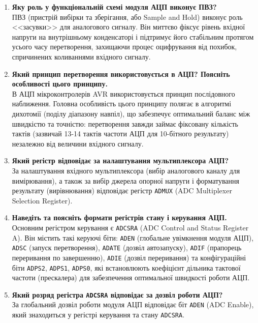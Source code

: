 \documentclass[14pt, a4paper]{extreport}
\begin{document}
\begin{enumerate}
		\item \textbf{Яку роль у функціональній схемі модуля АЦП виконує ПВЗ?} \\ ПВЗ (пристрій вибірки та зберігання, або Sample and Hold) виконує роль <<засувки>> для аналогового сигналу. Він миттєво фіксує рівень вхідної напруги на внутрішньому конденсаторі і підтримує його стабільним протягом усього часу перетворення, захищаючи процес оцифрування від похибок, спричинених коливаннями вхідного сигналу.
		
		\item \textbf{Який принцип перетворення використовується в АЦП? Поясніть особливості цього принципу.} \\ В АЦП мікроконтролерів AVR використовується принцип послідовного наближення. Головна особливість цього принципу полягає в алгоритмі дихотомії (поділу діапазону навпіл), що забезпечує оптимальний баланс між швидкістю та точністю: перетворення завжди займає фіксовану кількість тактів (зазвичай 13-14 тактів частоти АЦП для 10-бітного результату) незалежно від величини вхідного сигналу.
		
		\item \textbf{Який регістр відповідає за налаштування мультиплексора АЦП?} \\ За налаштування вхідного мультиплексора (вибір аналогового каналу для вимірювання), а також за вибір джерела опорної напруги і форматування результату (вирівнювання) відповідає регістр \texttt{ADMUX} (ADC Multiplexer Selection Register).
		
		\item \textbf{Наведіть та поясніть формати регістрів стану і керування АЦП.} \\ Основним регістром керування є \texttt{ADCSRA} (ADC Control and Status Register A). Він містить такі керуючі біти: \texttt{ADEN} (глобальне увімкнення модуля АЦП), \texttt{ADSC} (запуск перетворення), \texttt{ADATE} (дозвіл автозапуску), \texttt{ADIF} (прапорець переривання по завершенню), \texttt{ADIE} (дозвіл переривання) та конфігураційні біти \texttt{ADPS2}, \texttt{ADPS1}, \texttt{ADPS0}, які встановлюють коефіцієнт дільника тактової частоти (прескалера) для забезпечення оптимальної швидкості роботи АЦП.
		
		\item \textbf{Який розряд регістра \texttt{ADCSRA} відповідає за дозвіл роботи АЦП?} \\ За глобальний дозвіл роботи модуля АЦП відповідає біт \texttt{ADEN} (ADC Enable), який знаходиться у регістрі керування та стану \texttt{ADCSRA}.
		

\end{enumerate}
\end{document}
